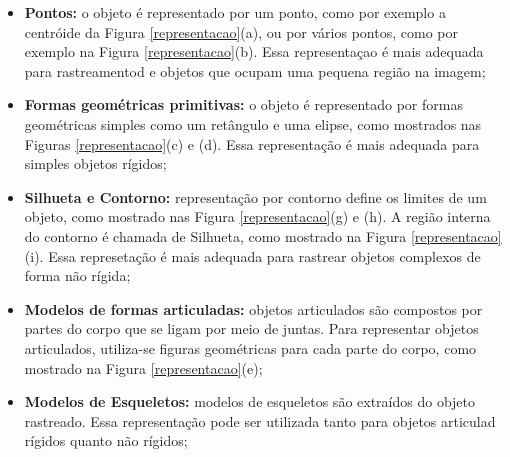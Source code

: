 	\begin{itemize}
		\item \textbf{Pontos:} o objeto é representado por um ponto, como por exemplo a centróide da Figura \ref{representacao}(a), ou por vários pontos, como por exemplo na Figura \ref{representacao}(b). Essa representaçao é mais adequada para rastreamentod e objetos que ocupam uma pequena região na imagem;
		\item \textbf{Formas geométricas primitivas:} o objeto é representado por formas geométricas simples como um retângulo e uma elipse, como mostrados nas Figuras \ref{representacao}(c) e (d). Essa representação é mais adequada para simples objetos rígidos;
		\item \textbf{Silhueta e Contorno:} representação por contorno define os limites de um objeto, como mostrado nas Figura \ref{representacao}(g) e (h). A região interna do contorno é chamada de Silhueta, como mostrado na Figura \ref{representacao}(i). Essa represetação é mais adequada para rastrear objetos complexos de forma não rígida;
		\item \textbf{Modelos de formas articuladas:} objetos articulados são compostos por partes do corpo que se ligam por meio de juntas. Para representar objetos articulados, utiliza-se figuras geométricas para cada parte do corpo, como mostrado na Figura \ref{representacao}(e);
		\item \textbf{Modelos de Esqueletos:} modelos de esqueletos são extraídos do objeto rastreado. Essa representação pode ser utilizada tanto para objetos articulad rígidos quanto não rígidos;
	\end{itemize}





























